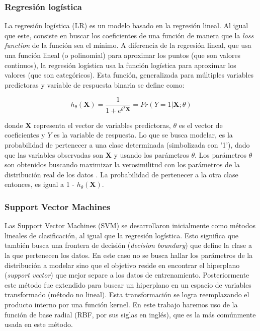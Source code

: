 \subsubsection{Regresión logística}

La regresión logística (LR) es un modelo basado en la regresión lineal. Al igual que este, consiste en buscar los coeficientes de una función de manera que la \textit{loss function} de la función sea el mínimo. A diferencia de la regresión lineal, que usa una función lineal (o polinomial) para aproximar los puntos (que son valores continuos), la regresión logística usa la función logística para aproximar los valores (que son categóricos). Esta función, generalizada para múltiples variables predictoras y variable de respuesta binaria se define como:

\begin{equation*}
h_{\theta}(\boldsymbol{X}) = \frac{1}{1 + e^{\theta^{T}\boldsymbol{X}}} = Pr(Y = 1 | \boldsymbol{X}; \theta)
\end{equation*}

donde $\boldsymbol{X}$ representa el vector de variables predictoras, $\theta$ es el vector de coeficientes y $Y$ es la variable de respuesta. Lo que se busca modelar, es la probabilidad de pertenecer a una clase determinada (simbolizada con '1'), dado que las variables observadas son $\boldsymbol{X}$ y usando los parámetros $\theta$. Los parámetros $\theta$ son obtenidos buscando maximizar la verosimilitud con los parámetros de la distribución real de los datos \cite{Hastie2001}. La probabilidad de pertenecer a la otra clase entonces, es igual a 1 - $h_{\theta}(\boldsymbol{X})$.

\subsubsection{Support Vector Machines}

Las Support Vector Machines (SVM) se desarrollaron inicialmente como métodos lineales de clasificación, al igual que la regresión logística. Esto significa que también busca una frontera de decisión (\textit{decision boundary}) que define la clase a la que pertenecen los datos. En este caso no se busca hallar los parámetros de la distribución a modelar sino que el objetivo reside en encontrar el hiperplano (\textit{support vector}) que mejor separe a los datos de entrenamiento. Posteriormente este método fue extendido para buscar un hiperplano en un espacio de variables transformado (método no lineal). Esta transformación se logra reemplazando el producto interno por una función kernel. En este trabajo haremos uso de la función de base radial (RBF, por sus siglas en inglés), que es la más comúnmente usada en este método.

